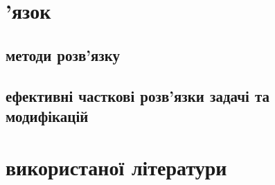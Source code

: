 \documentclass[14pt]{article}
\begin{document}
\begin{spacing}{1.175}
        

    \section{'язок}
        \subsection{ методи розв'язку}
        \subsection{ ефективні часткові розв'язки задачі та модифікацій}

    \section{ використаної літератури}

    \newpage
    

    




    
	\end{spacing}
\end{document}
